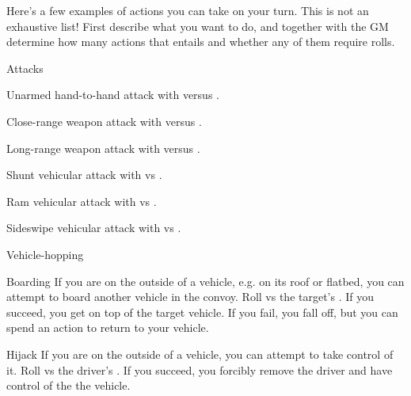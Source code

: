 
Here's a few examples of actions you can take on your turn. This is not an exhaustive list! First describe what you want to do, and together with the GM determine how many actions that entails and whether any of them require rolls.

\begin{abstractsection}{Attacks}
\vspace{1ex}

\begin{describe}{Unarmed hand-to-hand}
  attack with  versus .
\end{describe}

\begin{describe}{Close-range weapon}
  attack with  versus .
\end{describe}

\begin{describe}{Long-range weapon}
  attack with  versus .
\end{describe}

\begin{describe}{Shunt}
  vehicular attack with  vs .
\end{describe}

\begin{describe}{Ram}
  vehicular attack with  vs .
\end{describe}

\begin{describe}{Sideswipe}
  vehicular attack with  vs .
\end{describe}
\end{abstractsection}

\begin{abstractsection}{Vehicle-hopping}
\vspace{1ex}
\begin{describe}{Boarding}
  If you are on the outside of a vehicle, e.g. on its roof or flatbed, you can attempt to board another vehicle in the convoy. Roll  vs the target's . If you succeed, you get on top of the target vehicle. If you fail, you fall off, but you can spend an action to return to your vehicle.
\end{describe}

\begin{describe}{Hijack}
  If you are on the outside of a vehicle, you can attempt to take control of it. Roll  vs the driver's . If you succeed, you forcibly remove the driver and have control of the the vehicle.
\end{describe}
\end{abstractsection}

